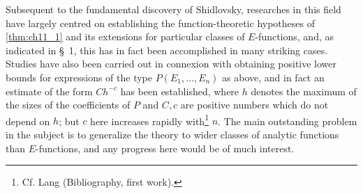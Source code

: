 Subsequent to the fundamental discovery of Shidlovsky, researches in this field have largely centred on establishing the function-theoretic hypotheses of \autoref{thm:ch11_1} and its extensions for particular classes of $E$-functions, and, as indicated in \S~1, this has in fact been accomplished in many striking cases. Studies have also been carried out in connexion with obtaining positive lower bounds for expressions of the type $P(E_1, \ldots, E_n)$ as above, and in fact an estimate of the form $C h^{-c}$ has been established, where $h$ denotes the maximum of the sizes of the coefficients of $P$ and $C, c$ are positive numbers which do not depend on $h$; 
but $c$ here increases rapidly with\footnote{Cf. Lang (Bibliography, first work).} $n$. The main outstanding problem in the subject is to generalize the theory to wider classes of analytic functions than $E$-functions, and any progress here would be of much interest.